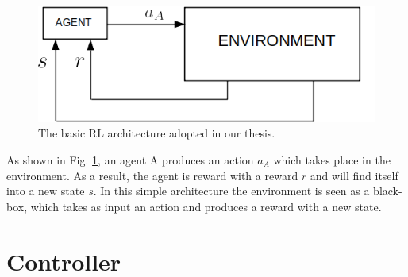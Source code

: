  \begin{figure}
    \centering
 	  \captionsetup{width=12cm}
      \includegraphics[width=12cm]{./img/diagram2}
     \caption{The basic RL architecture adopted in our thesis.}
   \label{fig:diagram}
  \end{figure}
As shown in Fig. \ref{fig:diagram}, an agent A produces an action $a_A$ which takes place in the environment. As a result, the agent is reward with a reward $r$ and will find itself into a new state $s$. In this simple architecture the environment is seen as a black-box, which takes as input an action and produces a reward with a new state.







\section{Controller}
